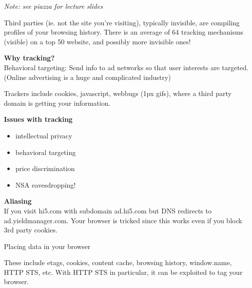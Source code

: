 \textit{Note: see piazza for lecture slides}

Third parties (ie. not the site you're visiting), typically invisible, are compiling profiles of your browsing history. There is an average of 64 tracking mechanisms (visible) on a top 50 website, and possibly more invisible ones! 

\textbf{Why tracking?}\\
Behavioral targeting: Send info to ad networks so that user interests are targeted.(Online advertising is a huge and complicated industry)

Trackers include cookies, javascript, webbugs (1px gifs), where a third party domain is getting your information.


\textbf{Issues with tracking}\\
\begin{itemize}
	\item intellectual privacy
	\item behavioral targeting
	\item price discrimination
	\item NSA eavesdropping!\\
\end{itemize}

\textbf{Aliasing} \\
If you visit hi5.com with subdomain ad.hi5.com but DNS redirects to ad.yieldmanager.com. Your browser is tricked since this works even if you block 3rd party cookies.

Placing data in your browser

These include etags, cookies, content cache, browsing history, window.name, HTTP STS, etc. With HTTP STS in particular, it can be exploited to tag your browser.

